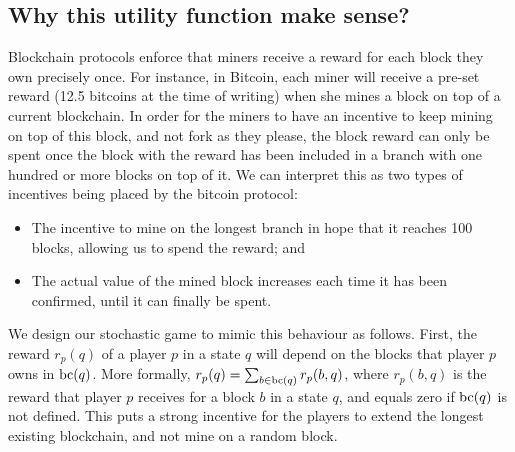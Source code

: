 \subsection{Why this utility function make sense?}\label{sec-wtf}


Blockchain protocols enforce that miners receive a reward for each block they own precisely once. For instance, in Bitcoin, each miner will receive a pre-set reward (12.5 bitcoins at the time of writing) when she mines a block on top of a current blockchain. In order for the miners to have an incentive to keep mining on top of this block, and not fork as they please, the block reward can only be spent once the block with the reward has been included in a branch with one hundred or more blocks on top of it. We can interpret this as two types of incentives being placed by the bitcoin protocol:
\begin{itemize}
\item The incentive to mine on the longest branch in hope that it reaches 100 blocks, allowing us to spend the reward; and
\item The actual value of the mined block increases each time it has been confirmed, until it can finally be spent.
\end{itemize}

We design our stochastic game to mimic this behaviour as follows.  First, the reward $r_p(q)$ of a player $p$ in a state $q$ will depend on the blocks that player $p$ owns in $\text{bc}(q)$. More formally, $r_p(q)= \sum_{b \in \text{bc}(q)} r_p(b,q)$, where $r_p(b,q)$ is the reward that player $p$ receives for a block $b$ in a state $q$, and equals zero if $\text{bc}(q)$ is not defined. This puts a strong incentive for the players to extend the longest existing blockchain, and not mine on a random block. 

